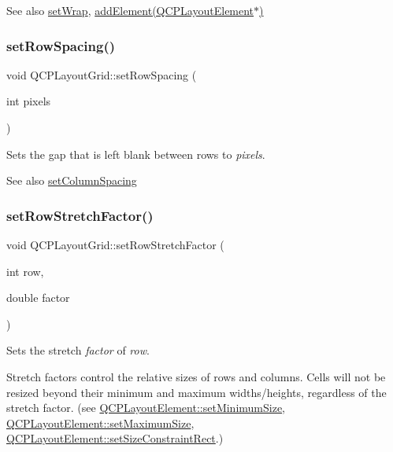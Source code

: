 \begin{DoxySeeAlso}{See also}
\mbox{\hyperlink{class_q_c_p_layout_grid_ab36af18d77e4428386d02970382ee598}{set\+Wrap}}, \mbox{\hyperlink{class_q_c_p_layout_grid_a4c44025dd25acd27e053cadfd448ad7b}{add\+Element(\+Q\+C\+P\+Layout\+Element$\ast$)}} 
\end{DoxySeeAlso}
\mbox{\label{class_q_c_p_layout_grid_aaef2cd2d456197ee06a208793678e436}} 
\subsubsection{\texorpdfstring{setRowSpacing()}{setRowSpacing()}}
{\footnotesize\ttfamily void Q\+C\+P\+Layout\+Grid\+::set\+Row\+Spacing (\begin{DoxyParamCaption}\item[{int}]{pixels }\end{DoxyParamCaption})}

Sets the gap that is left blank between rows to {\itshape pixels}.

\begin{DoxySeeAlso}{See also}
\mbox{\hyperlink{class_q_c_p_layout_grid_a3a49272aba32bb0fddc3bb2a45a3dba0}{set\+Column\+Spacing}} 
\end{DoxySeeAlso}
\mbox{\label{class_q_c_p_layout_grid_a7b0273de5369bd93d942edbaf5b166ec}} 
\subsubsection{\texorpdfstring{setRowStretchFactor()}{setRowStretchFactor()}}
{\footnotesize\ttfamily void Q\+C\+P\+Layout\+Grid\+::set\+Row\+Stretch\+Factor (\begin{DoxyParamCaption}\item[{int}]{row,  }\item[{double}]{factor }\end{DoxyParamCaption})}

Sets the stretch {\itshape factor} of {\itshape row}.

Stretch factors control the relative sizes of rows and columns. Cells will not be resized beyond their minimum and maximum widths/heights, regardless of the stretch factor. (see \mbox{\hyperlink{class_q_c_p_layout_element_a5dd29a3c8bc88440c97c06b67be7886b}{Q\+C\+P\+Layout\+Element\+::set\+Minimum\+Size}}, \mbox{\hyperlink{class_q_c_p_layout_element_a74eb5280a737ab44833d506db65efd95}{Q\+C\+P\+Layout\+Element\+::set\+Maximum\+Size}}, \mbox{\hyperlink{class_q_c_p_layout_element_a361666cdcc6fbfd37344cc44be746b0f}{Q\+C\+P\+Layout\+Element\+::set\+Size\+Constraint\+Rect}}.)

